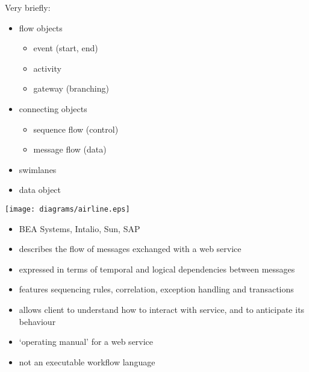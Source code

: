 \documentclass{sepslide-soa-faked} %
\begin{document}
\begin{slide}
Very briefly:
\begin{itemize}
\item flow objects
\begin{itemize}
\item event (start, end)
\item activity
\item gateway (branching)
\end{itemize}
\item connecting objects
\begin{itemize}
\item sequence flow (control)
\item message flow (data)
\end{itemize}
\item swimlanes
\item data object
\end{itemize}
\end{slide}

\begin{slide}
\begin{flushleft}
\texttt{[image: diagrams/airline.eps]}
\end{flushleft}
\end{slide}

\begin{slide}
\begin{itemize}
\item BEA Systems, Intalio, Sun, SAP
\item describes the flow of messages exchanged with a web service 
\item expressed in terms of temporal and logical dependencies between
messages
\item features sequencing rules, correlation, exception handling and
transactions 
\item allows client to understand how to interact with service, and to
anticipate its behaviour
\item `operating manual' for a web service
\item not an executable workflow language
\end{itemize}
\end{slide}
\end{document}
